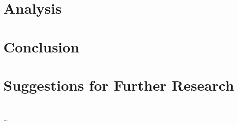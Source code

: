 \section{Analysis}
\label{sec:analysis}


\section{Conclusion}
\label{sec:conclusion}


\section{Suggestions for Further Research}
\label{sec:further_research}




\begin{acknowledgments}
\end{acknowledgments}


\appendix*

\section{}
\label{sec:}
\subsection{}
\dots
